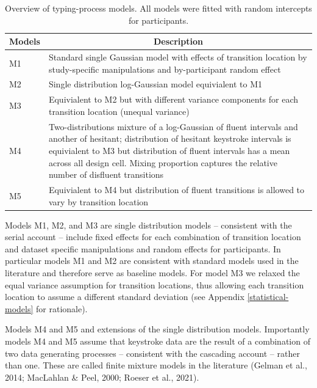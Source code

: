 \documentclass[
  english,
  man,floatsintext]{apa7}
\begin{document}
\begin{table}[tbp]

\begin{center}
\begin{threeparttable}

\caption{\label{tab:models}Overview of typing-process models. All models were fitted with random intercepts for participants.}

\begin{tabular}{lp{13cm}}
\toprule
Models & \multicolumn{1}{c}{Description}\\
\midrule
M1 & Standard single Gaussian model with effects of transition location by study-specific manipulations and by-participant random effect\\
M2 & Single distribution log-Gaussian model equivialent to M1\\
M3 & Equivialent to M2 but with different variance components for each transition location (unequal variance)\\
M4 & Two-distributions mixture of a log-Gaussian of fluent intervals and another of hesitant; distribution of hesitant keystroke intervals is equivialent to M3 but distribution of fluent intervals has a mean across all design cell. Mixing proportion captures the relative number of disfluent transitions\\
M5 & Equivialent to M4 but distribution of fluent transitions is allowed to vary by transition location\\
\bottomrule
\end{tabular}

\end{threeparttable}
\end{center}

\end{table}

Models M1, M2, and M3 are single distribution models -- consistent with the serial account -- include fixed effects for each combination of transition location and dataset specific manipulations and random effects for participants. In particular models M1 and M2 are consistent with standard models used in the literature and therefore serve as baseline models. For model M3 we relaxed the equal variance assumption for transition locations, thus allowing each transition location to assume a different standard deviation (see Appendix \ref{statistical-models} for rationale).

Models M4 and M5 and extensions of the single distribution models. Importantly models M4 and M5 assume that keystroke data are the result of a combination of two data generating processes -- consistent with the cascading account -- rather than one. These are called finite mixture models in the literature (Gelman et al., 2014; MacLahlan \& Peel, 2000; Roeser et al., 2021).
\end{document}
